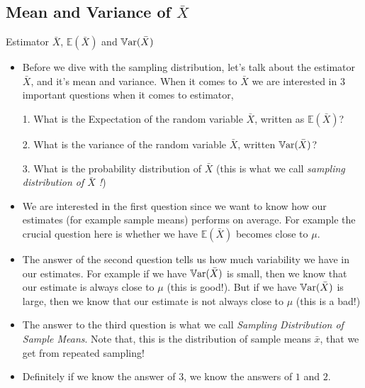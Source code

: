 \documentclass[8pt, usepdftitle=false]{beamer}
\begin{document}
\subsection{Mean and Variance of $\bar{X}$}
\frame{\subsectionpage}
\begin{frame}[allowframebreaks]{Estimator $\bar{X}$, $\mathbb{E}(\bar{X})$ and $\mathbb{V}\mathrm{ar}{(}\bar{X})$}



\begin{itemize}
  \item Before we dive with the sampling distribution, let's talk about the estimator $\bar{X}$, and it's mean and variance. When it comes to $\bar{X}$ we are interested in 3 important questions when it comes to estimator,

  \medskip


    \item[1.] What is the Expectation of the random variable $ \bar{X}$, written as $\mathbb{E}(\bar{X})$? 
    \item[2.] What is the variance of the random variable $ \bar{X}$, written $\mathbb{V}\mathrm{ar}{(}\bar{X})$?
    \item[3.] What is the probability distribution of $ \bar{X}$ (this is what we call \emph{sampling distribution of $ \bar{X}$ !})


  \framebreak

  \item We are interested in the first question since we want to know how our estimates (for example sample means) performs on average. For example the crucial question here is whether we have $\mathbb{E}( \bar{X})$ becomes close to $\mu$. 


  \item The answer of the second question tells us how much variability we have in our estimates. For example if we have $\mathbb{V}\mathrm{ar}{(}\bar{X})$ is small, then we know that our estimate is always close to $\mu$ (this is good!). But if we have $\mathbb{V}\mathrm{ar}{(}\bar{X})$ is large, then we know that our estimate is not always close to $\mu$ (this is a bad!)


  \item The answer to the third question is what we call \emph{Sampling Distribution of Sample Means}. Note that, this is the distribution of sample means $\bar{x}$, that we get from repeated sampling!


  \item Definitely if we know the answer of $3$, we know the answers of $1$ and $2$.


\end{itemize}
\end{frame}
\end{document}
